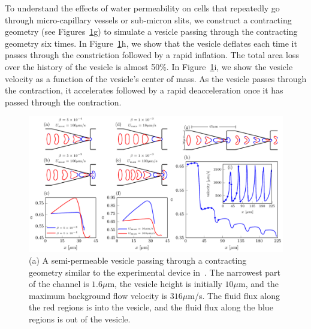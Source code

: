 \documentclass[9pt,twocolumn,twoside,lineno]{pnas-new}
\newif\ifTikz
\begin{document}
To understand the effects of water permeability on cells that repeatedly go through micro-capillary vessels or sub-micron slits, 
we construct a contracting geometry (see Figures~\ref{fig:contractingComposite}g)
to simulate a vesicle passing through the contracting geometry six times.
In Figure~\ref{fig:contractingComposite}h, we show that the vesicle
deflates each time it passes through the constriction followed by a
rapid inflation. The total area loss over the history of the vesicle is
almost 50\%. In Figure~\ref{fig:contractingComposite}i, we show the
vesicle velocity as a function of the vesicle's center of mass. As the
vesicle passes through the contraction, it accelerates followed by a
rapid deacceleration once it has passed through the contraction.


\begin{figure}[htp]
  \centering
  \ifTikz
  
  \else
  \includegraphics{figures/contractingComposite.pdf}
  \fi
  \caption{\label{fig:contractingComposite} (a) A semi-permeable vesicle
  passing through a contracting geometry similar to the experimental
  device in~\cite{}. The narrowest part of the channel is $1.6\mu$m, 
  the vesicle height is initially $10\mu$m, and the maximum background
  flow velocity is $316\mu$m/s. The fluid flux along the red regions is
  into the vesicle, and the fluid flux along the blue regions is out of
  the vesicle.}
\end{figure}



% 
 
\end{document}
